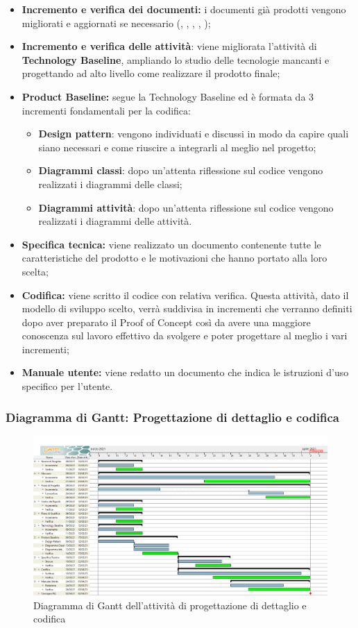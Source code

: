 \begin{itemize}
    \item \textbf{Incremento e verifica dei documenti:} i documenti già prodotti vengono migliorati e aggiornati se necessario ({\NdP}, {\PdP}, {\Glossario}, {\PdQ}, {\AdR});
    \item \textbf{Incremento e verifica delle attività}: viene migliorata l'attività di \textbf{Technology Baseline}, ampliando lo studio delle tecnologie mancanti e progettando ad alto livello come realizzare il prodotto finale;
    \item \textbf{Product Baseline:} segue la Technology Baseline ed è formata da 3 incrementi fondamentali per la codifica:
        \begin{itemize}
            \item \textbf{Design pattern}: vengono individuati e discussi in modo da capire quali siano necessari e come riuscire a integrarli al meglio nel progetto;
            \item \textbf{Diagrammi classi}: dopo un'attenta riflessione sul codice vengono realizzati i diagrammi delle classi;
            \item \textbf{Diagrammi attività}: dopo un'attenta riflessione sul codice vengono realizzati i diagrammi delle attività. 
        \end{itemize} 
    \item \textbf{Specifica tecnica:} viene realizzato un documento contenente tutte le caratteristiche del prodotto e le motivazioni che hanno portato alla loro scelta;
    \item \textbf{Codifica:} viene scritto il codice con relativa verifica. Questa attività, dato il modello di sviluppo scelto, verrà suddivisa in incrementi che verranno definiti dopo aver preparato il Proof of Concept così da avere una maggiore conoscenza sul lavoro effettivo da svolgere e poter progettare al meglio i vari incrementi;
    \item \textbf{Manuale utente:} viene redatto un documento che indica le istruzioni d'uso specifico per l'utente.
\end{itemize}
\newpage
\subsubsection{Diagramma di Gantt: Progettazione di dettaglio e codifica}
\begin{figure}[ht]
    \centering
    \includegraphics[width=\textwidth]{Immagini/GanttProgettazioneDiDettaglioECodifica}
    \caption{Diagramma di Gantt dell'attività di progettazione di dettaglio e codifica}
\end{figure}